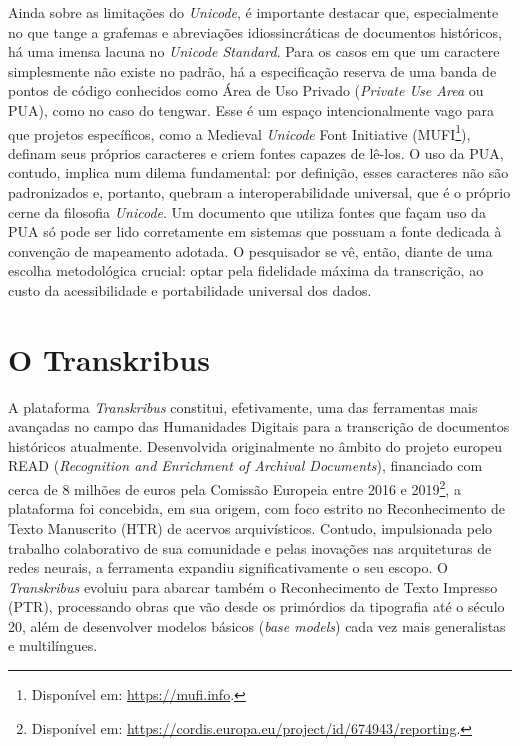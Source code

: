 \documentclass[portuguese]{textolivre}
\begin{document}
Ainda sobre as limitações do \textit{Unicode}, é importante destacar que, especialmente no que tange a grafemas e abreviações idiossincráticas de documentos históricos, há uma imensa lacuna no \textit{Unicode Standard}. Para os casos em que um caractere simplesmente não existe no padrão, há a especificação reserva de uma banda de pontos de código conhecidos como Área de Uso Privado (\textit{Private Use Area }ou PUA), como no caso do tengwar. Esse é um espaço intencionalmente vago para que projetos específicos, como a Medieval \textit{Unicode} Font Initiative (MUFI\footnote{Disponível em: \url{https://mufi.info}.}), definam seus próprios caracteres e criem fontes capazes de lê-los. O uso da PUA, contudo, implica num dilema fundamental: por definição, esses caracteres não são padronizados e, portanto, quebram a interoperabilidade universal, que é o próprio cerne da filosofia \textit{Unicode}. Um documento que utiliza fontes que façam uso da PUA só pode ser lido corretamente em sistemas que possuam a fonte dedicada à convenção de mapeamento adotada. O pesquisador se vê, então, diante de uma escolha metodológica crucial: optar pela fidelidade máxima da transcrição, ao custo da acessibilidade e portabilidade universal dos dados.

\section{O Transkribus}

A plataforma \textit{Transkribus} constitui, efetivamente, uma das ferramentas mais avançadas no campo das Humanidades Digitais para a transcrição de documentos históricos atualmente. Desenvolvida originalmente no âmbito do projeto europeu READ (\textit{Recognition and Enrichment of Archival Documents}), financiado com cerca de 8 milhões de euros pela Comissão Europeia entre 2016 e 2019\footnote{Disponível em: \url{https://cordis.europa.eu/project/id/674943/reporting}.}, a plataforma foi concebida, em sua origem, com foco estrito no Reconhecimento de Texto Manuscrito (HTR) de acervos arquivísticos. Contudo, impulsionada pelo trabalho colaborativo de sua comunidade e pelas inovações nas arquiteturas de redes neurais, a ferramenta expandiu significativamente o seu escopo. O \textit{Transkribus} evoluiu para abarcar também o Reconhecimento de Texto Impresso (PTR), processando obras que vão desde os primórdios da tipografia até o século 20, além de desenvolver modelos básicos (\textit{base models}) cada vez mais generalistas e multilíngues.
\end{document}
